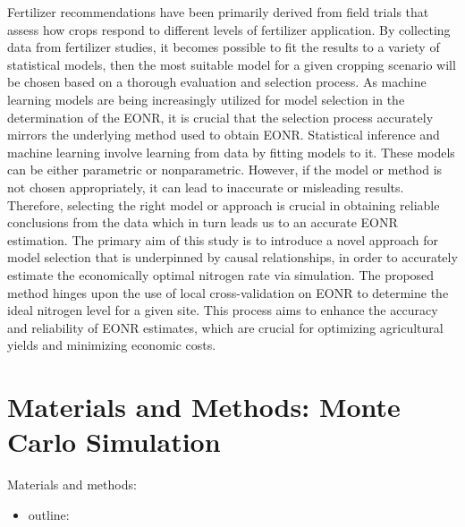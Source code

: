 \documentclass[
  12pt,
]{article}
\providecommand{\tightlist}{%
  \setlength{\itemsep}{0pt}\setlength{\parskip}{0pt}}
\begin{document}
Fertilizer recommendations have been primarily derived from field trials that assess how crops respond to different levels of fertilizer application. By collecting data from fertilizer studies, it becomes possible to fit the results to a variety of statistical models, then the most suitable model for a given cropping scenario will be chosen based on a thorough evaluation and selection process. As machine learning models are being increasingly utilized for model selection in the determination of the EONR, it is crucial that the selection process accurately mirrors the underlying method used to obtain EONR. Statistical inference and machine learning involve learning from data by fitting models to it. These models can be either parametric or nonparametric. However, if the model or method is not chosen appropriately, it can lead to inaccurate or misleading results. Therefore, selecting the right model or approach is crucial in obtaining reliable conclusions from the data which in turn leads us to an accurate EONR estimation.
The primary aim of this study is to introduce a novel approach for model selection that is underpinned by causal relationships, in order to accurately estimate the economically optimal nitrogen rate via simulation. The proposed method hinges upon the use of local cross-validation on EONR to determine the ideal nitrogen level for a given site. This process aims to enhance the accuracy and reliability of EONR estimates, which are crucial for optimizing agricultural yields and minimizing economic costs.

\hypertarget{materials-and-methods-monte-carlo-simulation}{%
\section{Materials and Methods: Monte Carlo Simulation}\label{materials-and-methods-monte-carlo-simulation}}

Materials and methods:

\begin{itemize}
\tightlist
\item
  outline:
\end{itemize}
\end{document}
